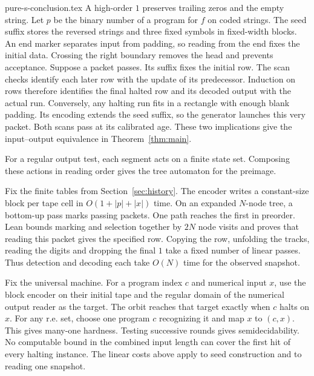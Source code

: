 \begin{filecontents*}[overwrite]{pure-s-conclusion.tex}
A high-order $1$ preserves trailing zeros and the empty string. Let $p$ be the binary number of a program for $f$ on coded strings. The seed suffix stores the reversed strings and three fixed symbols in fixed-width blocks. An end marker separates input from padding, so reading from the end fixes the initial data. Crossing the right boundary removes the head and prevents acceptance. Suppose a packet passes. Its suffix fixes the initial row. The scan checks identify each later row with the update of its predecessor. Induction on rows therefore identifies the final halted row and its decoded output with the actual run. Conversely, any halting run fits in a rectangle with enough blank padding. Its encoding extends the seed suffix, so the generator launches this very packet. Both scans pass at its calibrated age. These two implications give the input--output equivalence in Theorem~\ref{thm:main}.

For a regular output test, each segment acts on a finite state set. Composing these actions in reading order gives the tree automaton for the preimage.

Fix the finite tables from Section~\ref{sec:history}. The encoder writes a constant-size block per tape cell in $O(1+|p|+|x|)$ time. On an expanded $N$-node tree, a bottom-up pass marks passing packets. One path reaches the first in preorder. Lean bounds marking and selection together by $2N$ node visits and proves that reading this packet gives the specified row. Copying the row, unfolding the tracks, reading the digits and dropping the final $1$ take a fixed number of linear passes. Thus detection and decoding each take $O(N)$ time for the observed snapshot.

Fix the universal machine. For a program index $c$ and numerical input $x$, use the block encoder on their initial tape and the regular domain of the numerical output reader as the target. The orbit reaches that target exactly when $c$ halts on $x$. For any r.e. set, choose one program $c$ recognizing it and map $x$ to $(c,x)$. This gives many-one hardness. Testing successive rounds gives semidecidability. No computable bound in the combined input length can cover the first hit of every halting instance. The linear costs above apply to seed construction and to reading one snapshot.
\end{filecontents*}
